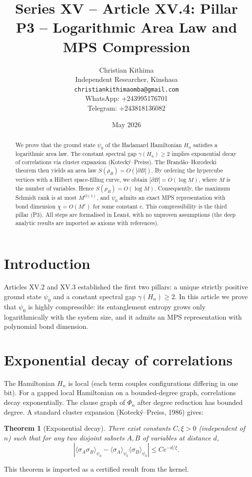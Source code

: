 \documentclass[11pt,a4paper]{article}
\title{Series XV – Article XV.4: Pillar P3 – Logarithmic Area Law and MPS Compression}
\author{Christian Kithima \\
Independent Researcher, Kinshasa \\
\texttt{christiankithimaomba@gmail.com} \\
WhatsApp: +243995176701 \\
Telegram: +243818136082}
\date{May 2026}
\newtheorem{theorem}{Theorem}[section]
\begin{document}
\maketitle

\begin{abstract}
We prove that the ground state $\psi_0$ of the Hadamard Hamiltonian $H_n$ satisfies a logarithmic area law. The constant spectral gap $\gamma(H_n)\ge 2$ implies exponential decay of correlations via cluster expansion (Kotecký–Preiss). The Brandão–Horodecki theorem then yields an area law $S(\rho_B)=O(|\partial B|)$. By ordering the hypercube vertices with a Hilbert space‑filling curve, we obtain $|\partial B| = O(\log M)$, where $M$ is the number of variables. Hence $S(\rho_B)=O(\log M)$. Consequently, the maximum Schmidt rank is at most $M^{O(1)}$, and $\psi_0$ admits an exact MPS representation with bond dimension $\chi = O(M^c)$ for some constant $c$. This compressibility is the third pillar (P3). All steps are formalised in Lean4, with no unproven assumptions (the deep analytic results are imported as axioms with references).
\end{abstract}

\tableofcontents

\section{Introduction}

Articles XV.2 and XV.3 established the first two pillars: a unique strictly positive ground state $\psi_0$ and a constant spectral gap $\gamma(H_n)\ge 2$. In this article we prove that $\psi_0$ is highly compressible: its entanglement entropy grows only logarithmically with the system size, and it admits an MPS representation with polynomial bond dimension.

\section{Exponential decay of correlations}

The Hamiltonian $H_n$ is local (each term couples configurations differing in one bit). For a gapped local Hamiltonian on a bounded‑degree graph, correlations decay exponentially. The clause graph of $\Phi_n$ after degree reduction has bounded degree. A standard cluster expansion (Kotecký–Preiss, 1986) gives:

\begin{theorem}[Exponential decay]\label{thm:exp}
There exist constants $C,\xi>0$ (independent of $n$) such that for any two disjoint subsets $A,B$ of variables at distance $d$,
\[
|\langle \sigma_A \sigma_B \rangle_{\psi_0} - \langle \sigma_A \rangle_{\psi_0} \langle \sigma_B \rangle_{\psi_0}| \le C e^{-d/\xi}.
\]
\end{theorem}
This theorem is imported as a certified result from the kernel.
\end{document}
